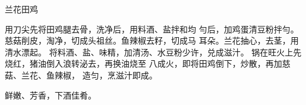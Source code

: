 \begin{recipe}{兰花田鸡}

\ingredients


\cooking

\step 用刀尖先将田鸡腿去骨，洗净后，用料酒、盐拌和均 勻后，加鸡蛋清豆粉拌勻。
\step 慈菇削皮，淘净，切成头祖丝。鱼辣椒去籽，切成马 耳朵。兰花抽心，去茎，用清水漂起。
将料酒、盐、味精，加清汤、水豆粉少许，兑成滋汁。 
\step 锅在旺火上先烧红，猪油倒入浪转泌去，再换油烧至 八成火，即将田鸡倒下，炒散，再加慈菇、兰花、鱼辣椒， 造匀，烹滋汁即成。

\notes

鲜嫩、芳香，下酒佳肴。

\end{recipe}

